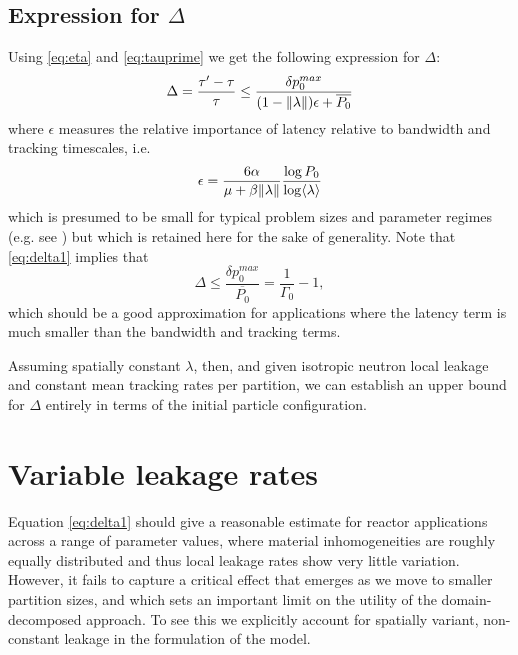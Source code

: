 \subsection{Expression for $\Delta$}

Using \eqref{eq:eta} and \eqref{eq:tauprime} we get the following expression for
$\Delta$:
\begin{equation}
  \label{eq:delta1}
  \Delta = \frac{\tau'-\tau}{\tau} \le \frac{\delta p_0^{max}} { (1-\| \lambda \|)
    \epsilon + \overline{P_0} }
\end{equation}
where $\epsilon$ measures the relative importance of latency relative to
bandwidth and tracking timescales, i.e.
\begin{equation}
  \label{eq:latency}
  \epsilon = \frac{6 \alpha}{\mu + \beta \| \lambda \|} \frac{\log P_0}{\log \langle \lambda \rangle}
\end{equation}
which is presumed to be small for typical problem sizes and parameter regimes
(e.g. see \cite{jcp-siegel-2012-1}) but which is retained here for the sake of
generality.  Note that \eqref{eq:delta1} implies that
\begin{equation}
  \label{eq:delta3}
  \Delta \le \frac{\delta p_0^{max}}{\overline{P_0}} =\frac{1} {\Gamma_0} - 1,
\end{equation}
which should be a good approximation for applications where the latency term is
much smaller than the bandwidth and tracking terms.

Assuming spatially constant $\lambda$, then, and given isotropic neutron local
leakage and constant mean tracking rates per partition, we can establish an
upper bound for $\Delta$ entirely in terms of the initial particle
configuration.

\section{Variable leakage rates}
\label{sec:var_leak}

Equation \eqref{eq:delta1} should give a reasonable estimate for reactor applications
across a range of parameter values, where material inhomogeneities are roughly
equally distributed and thus local leakage rates show very little
variation. However, it fails to capture a critical effect that emerges as we
move to smaller partition sizes, and which sets an important limit on the
utility of the domain-decomposed approach.  To see this we explicitly account
for spatially variant, non-constant leakage in the formulation of the model.


